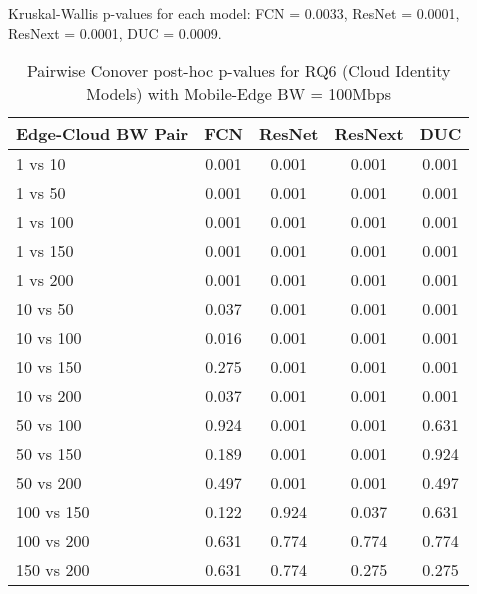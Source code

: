\begin{table}[h]
\centering
\caption{Pairwise Conover post-hoc p-values for RQ6 (Cloud Identity Models) with Mobile-Edge BW = 100Mbps}
\label{tab:conover_cloud_identity_me100}
\smallskip
Kruskal-Wallis p-values for each model: FCN = 0.0033, ResNet = 0.0001, ResNext = 0.0001, DUC = 0.0009.

\begin{tabular}{lcccc}
\toprule
Edge-Cloud BW Pair & FCN & ResNet & ResNext & DUC \\
\midrule
1 vs 10 & 0.001 & 0.001 & 0.001 & 0.001 \\
1 vs 50 & 0.001 & 0.001 & 0.001 & 0.001 \\
1 vs 100 & 0.001 & 0.001 & 0.001 & 0.001 \\
1 vs 150 & 0.001 & 0.001 & 0.001 & 0.001 \\
1 vs 200 & 0.001 & 0.001 & 0.001 & 0.001 \\
10 vs 50 & 0.037 & 0.001 & 0.001 & 0.001 \\
10 vs 100 & 0.016 & 0.001 & 0.001 & 0.001 \\
10 vs 150 & 0.275 & 0.001 & 0.001 & 0.001 \\
10 vs 200 & 0.037 & 0.001 & 0.001 & 0.001 \\
50 vs 100 & 0.924 & 0.001 & 0.001 & 0.631 \\
50 vs 150 & 0.189 & 0.001 & 0.001 & 0.924 \\
50 vs 200 & 0.497 & 0.001 & 0.001 & 0.497 \\
100 vs 150 & 0.122 & 0.924 & 0.037 & 0.631 \\
100 vs 200 & 0.631 & 0.774 & 0.774 & 0.774 \\
150 vs 200 & 0.631 & 0.774 & 0.275 & 0.275 \\
\bottomrule
\end{tabular}
\end{table}

